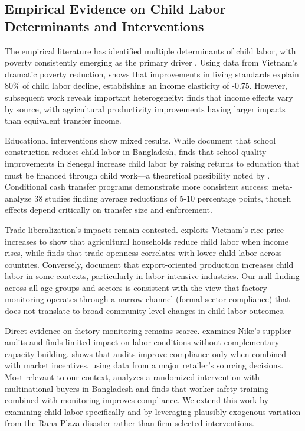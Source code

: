 \documentclass[12pt]{article}
\begin{document}
\subsection{Empirical Evidence on Child Labor Determinants and Interventions}

The empirical literature has identified multiple determinants of child labor, with poverty consistently emerging as the primary driver \cite{edmonds2005child, edmonds2015child}. Using data from Vietnam's dramatic poverty reduction, \cite{edmonds2005does} shows that improvements in living standards explain 80\% of child labor decline, establishing an income elasticity of -0.75. However, subsequent work reveals important heterogeneity: \citet{de2017child} finds that income effects vary by source, with agricultural productivity improvements having larger impacts than equivalent transfer income.

Educational interventions show mixed results. While \cite{ravallion2000wealth} document that school construction reduces child labor in Bangladesh, \citet{dumas2012does} finds that school quality improvements in Senegal increase child labor by raising returns to education that must be financed through child work—a theoretical possibility noted by \citet{rogers2014does}. Conditional cash transfer programs demonstrate more consistent success: \citet{dehoop2014cash} meta-analyze 38 studies finding average reductions of 5-10 percentage points, though effects depend critically on transfer size and enforcement.

Trade liberalization's impacts remain contested. \citet{edmonds2010trade} exploits Vietnam's rice price increases to show that agricultural households reduce child labor when income rises, while \citet{neumayer2005trade} finds that trade openness correlates with lower child labor across countries. Conversely, \citet{cigno2002child} document that export-oriented production increases child labor in some contexts, particularly in labor-intensive industries. Our null finding across all age groups and sectors is consistent with the view that factory monitoring operates through a narrow channel (formal-sector compliance) that does not translate to broad community-level changes in child labor outcomes.

Direct evidence on factory monitoring remains scarce. \citet{locke2007does} examines Nike's supplier audits and finds limited impact on labor conditions without complementary capacity-building. \citet{distelhorst2017production} shows that audits improve compliance only when combined with market incentives, using data from a major retailer's sourcing decisions. Most relevant to our context, \citet{boudreau2019firms} analyzes a randomized intervention with multinational buyers in Bangladesh and finds that worker safety training combined with monitoring improves compliance. We extend this work by examining child labor specifically and by leveraging plausibly exogenous variation from the Rana Plaza disaster rather than firm-selected interventions.
\end{document}
